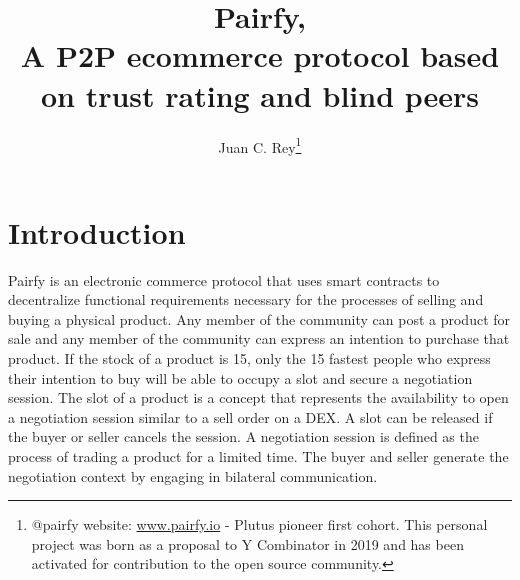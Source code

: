 \documentclass[12pt]{article}
\begin{document}
\title{\textbf{Pairfy,\\A P2P ecommerce protocol based on trust rating and blind peers }}

\author{Juan C. Rey\footnote{@pairfy  website: \url{www.pairfy.io} - Plutus pioneer first cohort. This personal project was born as a proposal to Y Combinator in 2019 and has been activated for contribution to the open source community.  }\\}

\maketitle

\renewcommand*\abstractname{\textbf{}\hfill}



\section{Introduction}

Pairfy is an electronic commerce protocol that uses smart contracts to decentralize functional requirements necessary for the processes of selling and buying a physical product.
Any member of the community can post a product for sale and any member of the community can express an intention to purchase that product.
If the stock of a product is 15, only the 15 fastest people who express their intention to buy will be able to occupy a slot and secure a negotiation session.
The slot of a product is a concept that represents the availability to open a negotiation session similar to a sell order on a DEX. A slot can be released if the buyer or seller cancels the session.
A negotiation session is defined as the process of trading a product for a limited time. The buyer and seller generate the negotiation context by engaging in bilateral communication.
\end{document}
